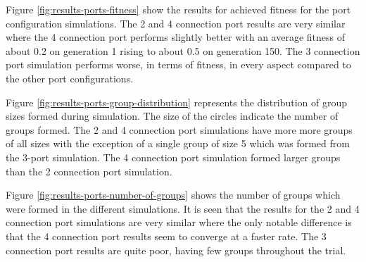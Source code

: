 \vspace*{\fill}


Figure \ref{fig:results-ports-fitness} show the results for achieved fitness for the port configuration simulations.
The 2 and 4 connection port results are very similar where the 4 connection port performs slightly better with an average fitness of about 0.2 on generation 1 rising to about 0.5 on generation 150. 
The 3 connection port simulation performs worse, in terms of fitness, in every aspect compared to the other port configurations.

\vspace*{\fill}
\newpage
\vspace*{\fill}


Figure \ref{fig:results-ports-group-distribution} represents the distribution of group sizes formed during simulation.
The size of the circles indicate the number of groups formed.
The 2 and 4 connection port simulations have more more groups of all sizes with the exception of a single group of size 5 which was formed from the 3-port simulation.
The 4 connection port simulation formed larger groups than the 2 connection port simulation.

\vspace*{\fill}
\newpage
\vspace*{\fill}


Figure \ref{fig:results-ports-number-of-groups} shows the number of groups which were formed in the different simulations.
It is seen that the results for the 2 and 4 connection port simulations are very similar where the only notable difference is that the 4 connection port results seem to converge at a faster rate.
The 3 connection port results are quite poor, having few groups throughout the trial.

